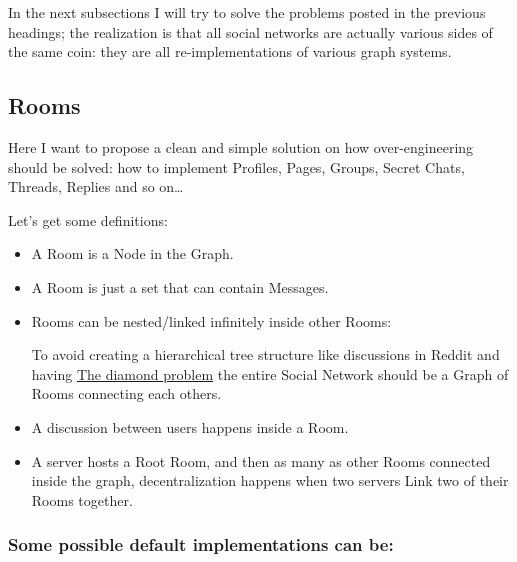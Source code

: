 \documentclass[12pt]{article}
\begin{document}
In the next subsections I will try to solve the problems posted in the previous headings; the realization is that all social networks are actually various sides of the same coin: they are all re-implementations of various graph systems.

\subsection{Rooms}

Here I want to propose a clean and simple solution on how over-engineering should be solved: 
\newline
how to implement Profiles, Pages, Groups, Secret Chats, Threads, Replies and so on\dots

Let's get some definitions:

\begin{itemize}

    \item A Room is a Node in the Graph.

    \item A Room is just a set that can contain Messages.

    \item Rooms can be nested/linked infinitely inside other Rooms:

    To avoid creating a hierarchical tree structure like discussions in Reddit and having \href{https://en.wikipedia.org/wiki/Multiple_inheritance#The_diamond_problem}{The diamond problem} the entire Social Network should be a Graph of Rooms connecting each others.

    \item A discussion between users happens inside a Room.

    \item A server hosts a Root Room, and then as many as other Rooms connected inside the graph, decentralization happens when two servers Link two of their Rooms together.

\end{itemize}

\subsubsection*{Some possible default implementations can be:}
\end{document}
